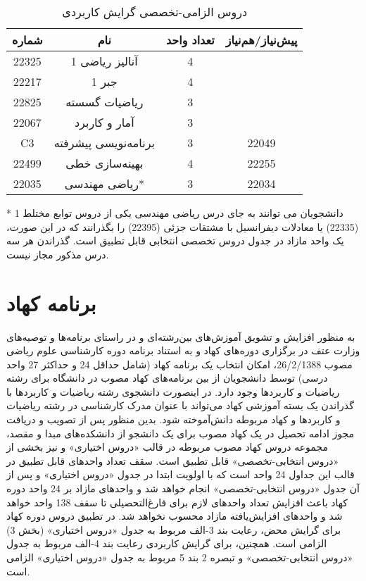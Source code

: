 \documentclass{article}
\begin{document}
\begin{table}[H]
\begin{center}
\begin{tabular}{|c|c|c|c|}
	\hline
	شماره & نام & تعداد واحد & پیش‌نیاز/هم‌نیاز \\
	\hline
	22325 & آنالیز ریاضی 1 & 4 &  \\
	\hline
	22217 & جبر 1 & 4 &  \\
	\hline
	22825 & ریاضیات گسسته & 3 &  \\
	\hline
	22067 & آمار و کاربرد & 3 &  \\
	\hline
	C3 & برنامه‌نویسی پیشرفته & 3 & 22049 \\
	\hline
	22499 & بهینه‌سازی خطی  & 4 & 22255 \\
	\hline
	22035 & ریاضی مهندسی* & 3 & 22034 \\
        \hline
    \end{tabular}
    \caption{\label{math-t3-2}
     دروس الزامی-تخصصی گرایش کاربردی
    }
    \end{center}
    \end{table}
* دانشجویان می توانند به جای درس ریاضی مهندسی یکی از دروس توابع مختلط 1 (22335) یا معادلات دیفرانسیل با مشتقات جزئی (22395) را بگذرانند که در این صورت، یک واحد مازاد در جدول دروس تخصصی انتخابی قابل تطبیق است. گذراندن هر سه درس مذکور مجاز نیست.

\pagebreak

\section{برنامه کهاد}
\label{mathkehad}
به منظور افزایش و تشویق آموزش‌های بین‌رشته‌ای و در راستای برنامه‌ها و توصیه‌های وزارت عتف در برگزاری دوره‌های کهاد و به استناد برنامه دوره کارشناسی علوم ریاضی مصوب 26/2/1388، امکان انتخاب یک برنامه کهاد (شامل حداقل 24 و حداکثر 27 واحد درسی) توسط دانشجویان از بین برنامه‌های کهاد مصوب در دانشگاه برای رشته ریاضیات و کاربردها وجود دارد. در اینصورت دانشجوی  رشته ریاضیات و کاربردها با گذراندن یک بسته آموزشی کهاد می‌تواند با عنوان مدرک کارشناسی در رشته ریاضیات و کاربردها و کهاد مربوطه دانش‌آموخته شود. بدین منظور پس از تصویب و دریافت مجوز ادامه تحصیل در یک کهاد مصوب برای یک دانشجو از دانشکده‌های مبدا و مقصد، مجموعه دروس کهاد مصوب مربوطه در قالب «دروس اختیاری» و نیز بخشی از «دروس انتخابی-تخصصی» قابل تطبیق است. سقف تعداد واحدهای قابل تطبیق در قالب این جداول 24 واحد است که با اولویت ابتدا در جدول «دروس اختیاری» و پس از آن جدول «دروس انتخابی-تخصصی» انجام خواهد شد و واحدهای مازاد بر 24 واحد دوره کهاد باعث افزایش تعداد واحدهای لازم برای فارغ‌التحصیلی تا سقف 138 واحد خواهد شد و واحدهای افزایش‌یافته مازاد محسوب نخواهد شد. در تطبیق دروس دوره کهاد برای گرایش محض، رعایت بند 3-الف مربوط به جدول «دروس اختیاری» (بخش 3) الزامی است. همچنین، برای گرایش کاربردی رعایت بند 4-الف مربوط به جدول «دروس انتخابی-تخصصی» و تبصره 2 بند 5 مربوط به جدول «دروس اختیاری» الزامی است.
\end{document}
